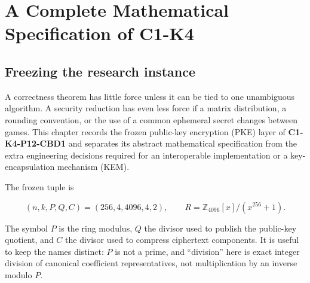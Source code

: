 \documentclass[
  11pt,
  a4paper,
  oneside]{report}
\begin{document}
\chapter{A Complete Mathematical Specification of
C1-K4}\label{a-complete-mathematical-specification-of-c1-k4}

\section{Freezing the research
instance}\label{freezing-the-research-instance}

A correctness theorem has little force unless it can be tied to one
unambiguous algorithm. A security reduction has even less force if a
matrix distribution, a rounding convention, or the use of a common
ephemeral secret changes between games. This chapter records the frozen
public-key encryption (PKE) layer of \textbf{C1-K4-P12-CBD1} and
separates its abstract mathematical specification from the extra
engineering decisions required for an interoperable implementation or a
key-encapsulation mechanism (KEM).

The frozen tuple is

\[
(n,k,P,Q,C)=(256,4,4096,4,2),\qquad
R=\mathbb Z_{4096}[x]/(x^{256}+1).
\]

The symbol \(P\) is the ring modulus, \(Q\) the divisor used to publish
the public-key quotient, and \(C\) the divisor used to compress
ciphertext components. It is useful to keep the names distinct: \(P\) is
not a prime, and ``division'' here is exact integer division of
canonical coefficient representatives, not multiplication by an inverse
modulo \(P\).
\end{document}
